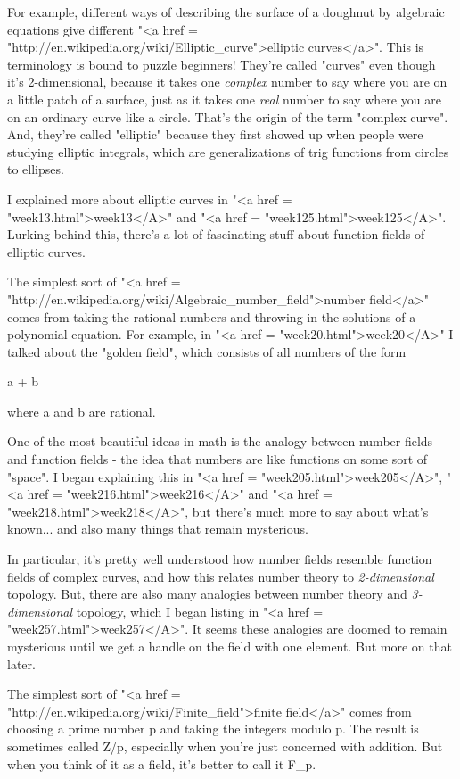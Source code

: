 For example, different ways of describing the surface of a doughnut by
algebraic equations give different "<a href =
"http://en.wikipedia.org/wiki/Elliptic_curve">elliptic
curves</a>".  This is terminology is bound
to puzzle beginners!  They're called "curves" even though
it's 2-dimensional, because it takes one \emph{complex} number to
say where you are on a little patch of a surface, just as it takes one
\emph{real} number to say where you are on an ordinary curve like a
circle.  That's the origin of the term "complex curve".
And, they're called "elliptic" because they first showed up
when people were studying elliptic integrals, which are
generalizations of trig functions from circles to ellipses.

I explained more about elliptic curves in "<a href = "week13.html">week13</A>" and "<a href = "week125.html">week125</A>".  
Lurking behind this, there's a lot of fascinating stuff about 
function fields of elliptic curves.

The simplest sort of "<a href =
"http://en.wikipedia.org/wiki/Algebraic_number_field">number
field</a>" comes from taking the rational numbers and throwing in
the solutions of a polynomial equation.  For example, in
"<a href = "week20.html">week20</A>" I talked about the
"golden field", which consists of all numbers of the form

a + b 

where a and b are rational.  

One of the most beautiful ideas in math is the analogy between 
number fields and function fields - the idea that numbers are like
functions on some sort of "space".  I began explaining this in
"<a href = "week205.html">week205</A>", "<a href = "week216.html">week216</A>" and "<a href = "week218.html">week218</A>", but there's much more to say
about what's known... and also many things that remain mysterious.  

In particular, it's pretty well understood how number fields resemble
function fields of complex curves, and how this relates number theory
to \emph{2-dimensional} topology.  But, there are also many
analogies between number theory and \emph{3-dimensional} topology,
which I began listing in "<a href =
"week257.html">week257</A>".  It seems these analogies are doomed
to remain mysterious until we get a handle on the field with one
element.  But more on that later.

The simplest sort of "<a href =
"http://en.wikipedia.org/wiki/Finite_field">finite field</a>"
comes from choosing a prime number p and taking the integers modulo p.
The result is sometimes called Z/p, especially when you're just
concerned with addition.  But when you think of it as a field, it's
better to call it F_{p}.

